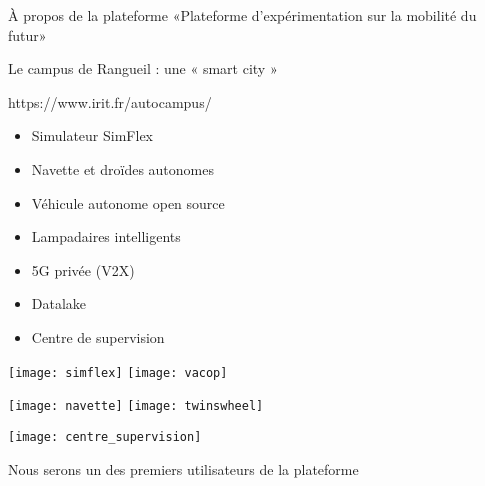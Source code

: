 \documentclass[aspectratio=169]{neocampus}
\begin{document}
\begin{frame}{À propos de la plateforme \autOCampus}
  \pause
  «Plateforme d'expérimentation sur la mobilité du futur»\pause

  Le campus de Rangueil : une « smart city »  \pause

  https://www.irit.fr/autocampus/ \pause

  \begin{minipage}[c]{.45\linewidth}
    \begin{itemize}
      \item Simulateur SimFlex
      \item Navette et droïdes autonomes
      \item Véhicule autonome open source
      \item Lampadaires intelligents
      \item 5G privée (V2X)
      \item Datalake
      \item Centre de supervision
    \end{itemize}

  \end{minipage}
  \hfill
  \begin{minipage}[c]{.3\linewidth}
    \centering
    \texttt{[image: simflex]}%
    \hfill
    \texttt{[image: vacop]}%

    \texttt{[image: navette]}%
    \hfill
    \texttt{[image: twinswheel]}%

    \texttt{[image: centre\_supervision]}%
  \end{minipage}

    \pause
    Nous serons un des premiers utilisateurs de la plateforme

\end{frame}
\end{document}
